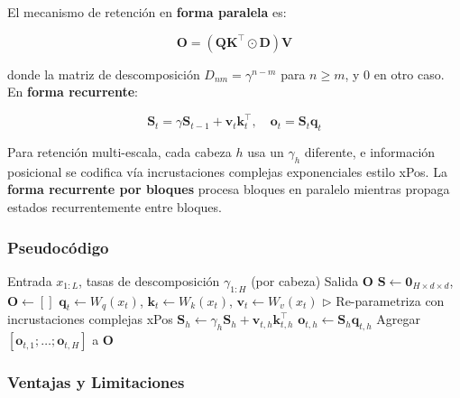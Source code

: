 \documentclass[11pt,a4paper]{article}
\begin{document}
El mecanismo de retención en \textbf{forma paralela} es:

\begin{equation}
\mathbf{O} = (\mathbf{Q}\mathbf{K}^\top \odot \mathbf{D}) \mathbf{V}
\end{equation}

donde la matriz de descomposición $D_{nm} = \gamma^{n-m}$ para $n \geq m$, y 0 en otro caso. En \textbf{forma recurrente}:

\begin{equation}
\mathbf{S}_t = \gamma \mathbf{S}_{t-1} + \mathbf{v}_t \mathbf{k}_t^\top, \quad \mathbf{o}_t = \mathbf{S}_t \mathbf{q}_t
\end{equation}

Para retención multi-escala, cada cabeza $h$ usa un $\gamma_h$ diferente, e información posicional se codifica vía incrustaciones complejas exponenciales estilo xPos. La \textbf{forma recurrente por bloques} procesa bloques en paralelo mientras propaga estados recurrentemente entre bloques.

\subsubsection{Pseudocódigo}

\begin{algorithm}
\caption{RetNet - Retención Multi-Escala}
\begin{algorithmic}[1]
\Require Entrada $x_{1:L}$, tasas de descomposición $\gamma_{1:H}$ (por cabeza)
\Ensure Salida $\mathbf{O}$
\State $\mathbf{S} \gets \mathbf{0}_{H \times d \times d}$, $\mathbf{O} \gets []$
    \State $\mathbf{q}_t \gets W_q(x_t)$, $\mathbf{k}_t \gets W_k(x_t)$, $\mathbf{v}_t \gets W_v(x_t)$
    \State \quad $\triangleright$ Re-parametriza con incrustaciones complejas xPos
        \State $\mathbf{S}_h \gets \gamma_h \mathbf{S}_h + \mathbf{v}_{t,h} \mathbf{k}_{t,h}^\top$
        \State $\mathbf{o}_{t,h} \gets \mathbf{S}_h \mathbf{q}_{t,h}$
    \EndFor
    \State Agregar $[\mathbf{o}_{t,1}; \ldots; \mathbf{o}_{t,H}]$ a $\mathbf{O}$
\EndFor
\end{algorithmic}
\end{algorithm}

\subsubsection{Ventajas y Limitaciones}
\end{document}
